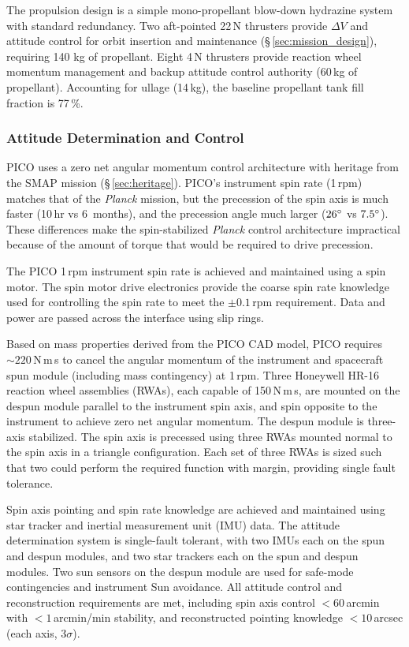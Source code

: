 The propulsion design is a simple mono-propellant blow-down hydrazine
system with standard redundancy. Two aft-pointed 22\,N thrusters
provide $\Delta V$ and attitude control for orbit insertion and
maintenance (\S\,\ref{sec:mission_design}), requiring 140 kg of
propellant.  Eight 4\,N thrusters provide reaction wheel momentum
management and backup attitude control authority (60\,kg of
propellant). Accounting for ullage (14\,kg), the baseline propellant
tank fill fraction is 77\,\%.


\subsubsection{Attitude Determination and Control}
\label{sec:attitude_determination} %

PICO uses a zero net angular momentum control architecture with
heritage from the SMAP mission (\S\,\ref{sec:heritage}). PICO's instrument
spin rate (1\,rpm) matches that of the \textit{Planck} mission, but
the precession of the spin axis is much faster (10\,hr vs 6\, months),
and the precession angle much larger ($26^\circ$ vs
$7.5^\circ$). These differences make the spin-stabilized
\textit{Planck} control architecture impractical because of the amount
of torque that would be required to drive precession.

The PICO 1\,rpm instrument spin rate is achieved and maintained using
a spin motor. The spin motor drive electronics provide the coarse spin
rate knowledge used for controlling the spin rate to meet the
$\pm0.1$\,rpm requirement. Data and power are passed across the
interface using slip rings.

Based on mass properties derived from the PICO CAD model, PICO
requires $\sim220$\,N\,m\,s to cancel the angular momentum of the
instrument and spacecraft spun module (including mass contingency) at
1\,rpm. Three Honeywell HR-16 reaction wheel assemblies (RWAs), each
capable of 150\,N\,m\,s, are mounted on the despun module parallel to
the instrument spin axis, and spin opposite to the instrument to
achieve zero net angular momentum. The despun module is three-axis
stabilized. The spin axis is precessed using three RWAs mounted normal
to the spin axis in a triangle configuration. Each set of three RWAs
is sized such that two could perform the required function with
margin, providing single fault tolerance.

Spin axis pointing and spin rate knowledge are achieved and maintained
using star tracker and inertial measurement unit (IMU) data. The
attitude determination system is single-fault tolerant, with two IMUs
each on the spun and despun modules, and two star trackers each on the
spun and despun modules. Two sun sensors on the despun module are used
for safe-mode contingencies and instrument Sun avoidance. All attitude
control and reconstruction requirements are met, including spin axis
control $< 60$\,arcmin with $< 1$\,arcmin/min stability, and
reconstructed pointing knowledge $< 10$\,arcsec (each axis, $3\sigma$).

